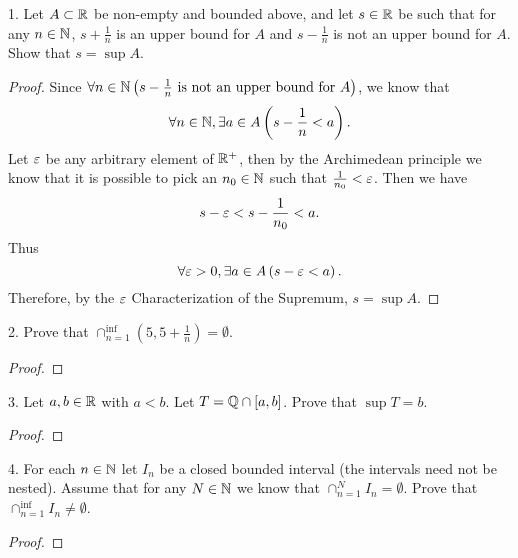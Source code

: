 
1. Let $A \subset \mathbb{R}$ be non-empty and bounded above, and let $s \in \mathbb{R}$ be such that for any $n \in \mathbb{N}$, $s + \frac{1}{n}$ is an upper bound for $A$ and $s-\frac{1}{n}$ is not an upper bound for $A$. Show that $s = \sup A$.

\begin{proof}
	Since $\forall n \in \mathbb{N} \left( s - \frac{1}{n} \text{ is not an upper bound for } A \right)$, we know that 
	\[
		\forall n \in \mathbb{N},  \exists a \in A\left( s - \frac{1}{n}< a \right)
	.\] 
	Let $\e$ be any arbitrary element of $\mathbb{R}^{+}$, then by the Archimedean principle we know that it is possible to pick an $n_0 \in \mathbb{N}$ such that $\frac{1}{n_0} < \e$. Then we have
	\[
		s - \e < s - \frac{1}{n_0} < a
	.\]
	Thus
	\[
		\forall \e > 0, \exists a \in A \left( s - \e < a \right) 
	.\]
	Therefore, by the $\e$ Characterization of the Supremum, $s = \sup A$.
\end{proof}



2. Prove that $\cap_{n=1}^{\inf}\left( 5, 5+\frac{1}{n} \right) = \emptyset$.

\begin{proof}
	
\end{proof}




3. Let $a, b \in \mathbb{R}$ with $a < b$. Let $T = \mathbb{Q} \cap [a, b]$. Prove that $\sup T = b$.

\begin{proof}
	
\end{proof}





4. For each $n \in \mathbb{N}$ let $I_n$ be a closed bounded interval (the intervals need not be nested). Assume that for any $N \in \mathbb{N}$ we know that $\cap_{n=1}^{N}I_n = \emptyset$. Prove that $\cap_{n=1}^{\inf}I_n \neq \emptyset$.

\begin{proof}
	
\end{proof}





